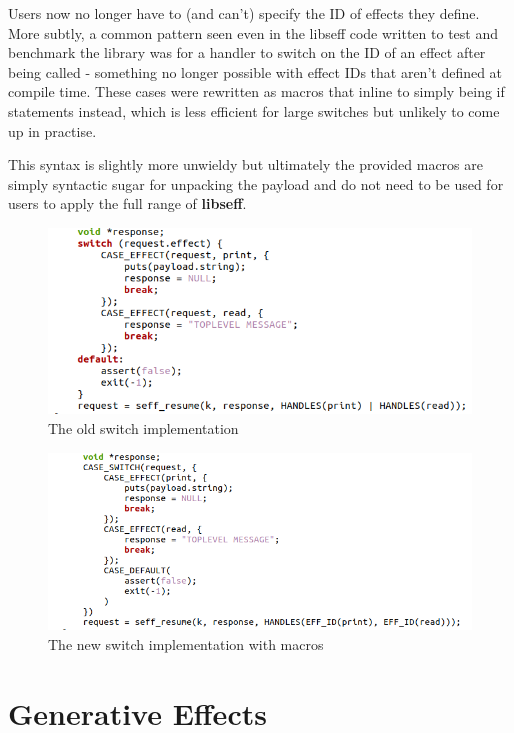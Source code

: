 \documentclass[logo,bsc,singlespacing,parskip,online]{infthesis}
\begin{document}
Users now no longer have to (and can't) specify the ID of effects they define. More subtly, a common pattern seen even in the libseff code written to test and benchmark the library was for a handler to switch on the ID of an effect after being called - something no longer possible with effect IDs that aren't defined at compile time. These cases were rewritten as macros that inline to simply being if statements instead, which is less efficient for large switches but unlikely to come up in practise.

This syntax is slightly more unwieldy but ultimately the provided macros are simply syntactic sugar for unpacking the payload and do not need to be used for users to apply the full range of \textbf{libseff}. 

\begin{figure}[ht]
    \centering
    \includegraphics[width=1\linewidth]{oldswitch.png}
    \caption{The old switch implementation}
    \label{fig:oldswitch}
\end{figure}

\begin{figure}[ht]
    \centering
    \includegraphics[width=1\linewidth]{newswitch.png}
    \caption{The new switch implementation with macros}
    \label{fig:newswitch}
\end{figure}

\section{Generative Effects}
\end{document}
